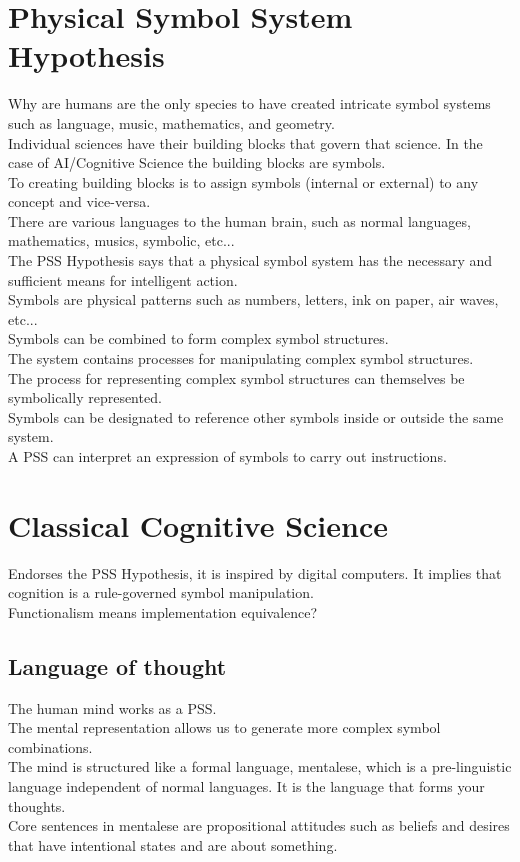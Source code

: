 \documentclass[11pt]{article}
\begin{document}
	\thispagestyle{empty}
	\tableofcontents
	
	\newpage
	\setcounter{page}{1}
	\section{Physical Symbol System Hypothesis}
	Why are humans are the only species to have created intricate symbol systems such as language, music, mathematics, and geometry.\\
	Individual sciences have their building blocks that govern that science. In the case of AI/Cognitive Science the building blocks are symbols.\\
	To creating building blocks is to assign symbols (internal or external) to any concept and vice-versa.\\
	There are various languages to the human brain, such as normal languages, mathematics, musics, symbolic, etc...\\
	The PSS Hypothesis says that a physical symbol system has the necessary and sufficient means for intelligent action.\\
	Symbols are physical patterns such as numbers, letters, ink on paper, air waves, etc...\\
	Symbols can be combined to form complex symbol structures.\\
	The system contains processes for manipulating complex symbol structures.\\
	The process for representing complex symbol structures can themselves be symbolically represented.\\
	Symbols can be designated to reference other symbols inside or outside the same system.\\
	A PSS can interpret an expression of symbols to carry out instructions.\\
	
	\newpage
	\section{Classical Cognitive Science}
	Endorses the PSS Hypothesis, it is inspired by digital computers. It implies that cognition is a rule-governed symbol manipulation.\\
	Functionalism means implementation equivalence?\\
	\subsection{Language of thought}
	The human mind works as a PSS.\\
	The mental representation allows us to generate more complex symbol combinations.\\
	The mind is structured like a formal language, mentalese, which is a pre-linguistic language independent of normal languages. It is the language that forms your thoughts.\\
	Core sentences in mentalese are propositional attitudes such as beliefs and desires that have intentional states and are about something.\\
\end{document}
